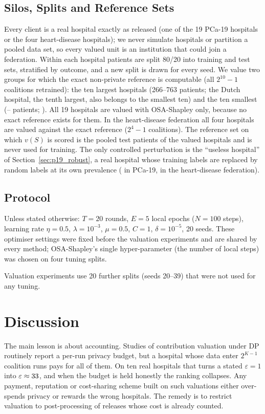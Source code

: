 \documentclass[journal]{IEEEtran}
\begin{document}
\subsection{Silos, Splits and Reference Sets}
\label{sec:silos}
Every client is a real hospital exactly as released (one of the 19 PCa-19 hospitals or the four heart-disease hospitals); we never simulate hospitals or partition a pooled data set, so every valued unit is an institution that could join a federation. Within each hospital patients are split 80/20 into training and test sets, stratified by outcome, and a new split is drawn for every seed. We value two groups for which the exact non-private reference is computable (all $2^{10}-1$ coalitions retrained): the ten largest hospitals (266--763 patients; the Dutch hospital, the tenth largest, also belongs to the smallest ten) and the ten smallest (\pxSmallMin--\pxSmallMax{} patients; \pxSmallHosp). All 19 hospitals are valued with OSA-Shapley only, because no exact reference exists for them. In the heart-disease federation all four hospitals are valued against the exact reference ($2^4-1$ coalitions). The reference set on which $v(S)$ is scored is the pooled test patients of the valued hospitals and is never used for training. The only controlled perturbation is the ``useless hospital'' of Section~\ref{sec:p19_robust}, a real hospital whose training labels are replaced by random labels at its own prevalence (\corrHosp{} in PCa-19, \hrCorrupt{} in the heart-disease federation).

\subsection{Protocol}
Unless stated otherwise: $T=20$ rounds, $E=5$ local epochs ($N=100$ steps), learning rate $\eta=0.5$, $\lambda=10^{-3}$, $\mu=0.5$, $C=1$, $\delta=10^{-5}$, 20 seeds. These optimiser settings were fixed before the valuation experiments and are shared by every method; OSA-Shapley's single hyper-parameter (the number of local steps) was chosen on four tuning splits.



Valuation experiments use 20 further splits (seeds 20--39) that were not used for any tuning.



\section{Discussion}
\label{sec:discussion}
The main lesson is about accounting. Studies of contribution valuation under DP routinely report a per-run privacy budget, but a hospital whose data enter $2^{K-1}$ coalition runs pays for all of them. On ten real hospitals that turns a stated $\varepsilon=1$ into $\varepsilon\approx33$, and when the budget is held honestly the ranking collapses. Any payment, reputation or cost-sharing scheme built on such valuations either over-spends privacy or rewards the wrong hospitals. The remedy is to restrict valuation to post-processing of releases whose cost is already counted.
\end{document}
